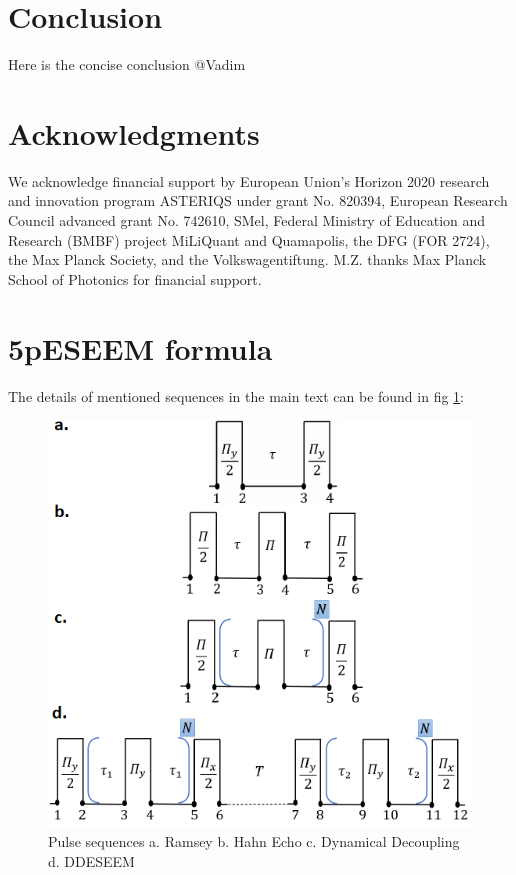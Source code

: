 \documentclass[%
 reprint,
superscriptaddress,
 amsmath,amssymb,
 aps,
]{revtex4-2}
\begin{document}
\section{Conclusion}
\label{sec:discussion}
Here is the concise conclusion @Vadim


\section*{Acknowledgments}
We acknowledge financial support by European Union's Horizon 2020 research and innovation program ASTERIQS under grant No. 820394, European Research Council advanced grant No. 742610, SMel, Federal Ministry of Education and Research (BMBF) project MiLiQuant and Quamapolis, the DFG (FOR 2724), the Max Planck Society, and the Volkswagentiftung. M.Z. thanks Max Planck School of Photonics for financial support.


\appendix
\section{5pESEEM formula}
\label{app:seqs}
The details of mentioned sequences in the main text can be found in fig \ref{fig:seqs}:
\begin{figure}%
	\begin{center}
		\includegraphics[width=0.9\columnwidth]{pict/seqs.png}
		\caption{Pulse sequences a. Ramsey b. Hahn Echo c. Dynamical Decoupling d. DDESEEM}
		\label{fig:seqs}
	\end{center}
\end{figure}
\end{document}
